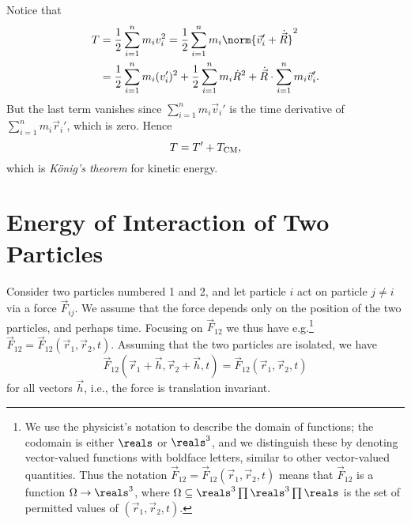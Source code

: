 \documentclass[article, a4paper, 11pt, oneside]{memoir}
\numberwithin{equation}{chapter}
\begin{document}
\begin{remarkbreak}
    Notice that
    \begin{align*}
        T
            &= \frac{1}{2} \sum_{i=1}^n m_i v_i^2
             = \frac{1}{2} \sum_{i=1}^n m_i \norm{\vec{v}_i' + \dot{\vec{R}}}^2 \\
            &= \frac{1}{2} \sum_{i=1}^n m_i (v_i')^2
              + \frac{1}{2} \sum_{i=1}^n m_i \dot{R}^2
              + \dot{\vec{R}} \cdot \sum_{i=1}^n m_i \vec{v}_i'.
    \end{align*}
    But the last term vanishes since $\sum_{i=1}^n m_i \vec{v}_i'$ is the time derivative of $\sum_{i=1}^n m_i \vec{r}_i'$, which is zero. Hence
    \begin{equation*}
        T
            = T' + T_{\mathrm{CM}},
    \end{equation*}
    which is \emph{König's theorem} for kinetic energy.
\end{remarkbreak}


\addtocounter{section}{7}
\section{Energy of Interaction of Two Particles}

Consider two particles numbered 1 and 2, and let particle $i$ act on particle $j \neq i$ via a force $\vec{F}_{ij}$. We assume that the force depends only on the position of the two particles, and perhaps time. Focusing on $\vec{F}_{12}$ we thus have e.g.\footnote{We use the physicist's notation to describe the domain of functions; the codomain is either $\reals$ or $\reals^3$, and we distinguish these by denoting vector-valued functions with boldface letters, similar to other vector-valued quantities. Thus the notation $\vec{F}_{12} = \vec{F}_{12}(\vec{r}_1, \vec{r}_2, t)$ means that $\vec{F}_{12}$ is a function $\Omega \to \reals^3$, where $\Omega \subseteq \reals^3 \prod \reals^3 \prod \reals$ is the set of permitted values of $(\vec{r}_1, \vec{r}_2, t)$.} $\vec{F}_{12} = \vec{F}_{12}(\vec{r}_1, \vec{r}_2, t)$. Assuming that the two particles are isolated, we have
%
\begin{equation*}
    \vec{F}_{12}(\vec{r}_1 + \vec{h}, \vec{r}_2 + \vec{h}, t)
    = \vec{F}_{12}(\vec{r}_1, \vec{r}_2, t)
\end{equation*}
%
for all vectors $\vec{h}$, i.e., the force is translation invariant.
\end{document}
